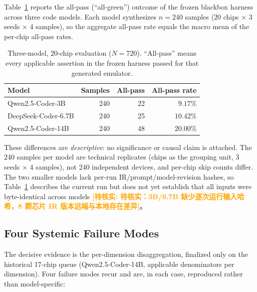 \documentclass[preprint,review]{elsarticle}
\theoremstyle{definition}
\newcommand{\unverified}[1]{\textcolor{orange}{\textbf{[待核实: #1]}}}
\begin{document}
Table~\ref{tab:three-model} reports the all-pass (``all-green'') outcome of the frozen
blackbox harness across three code models. Each model synthesizes $n=240$ samples (20 chips
$\times$ 3 seeds $\times$ 4 samples), so the aggregate all-pass rate equals the macro mean of
the per-chip all-pass rates.

\begin{table}[t]
\centering
\caption{Three-model, 20-chip evaluation ($N=720$). ``All-pass'' means every applicable
assertion in the frozen harness passed for that generated emulator.}
\label{tab:three-model}
\small
\begin{tabular}{@{}l r r r@{}}
\toprule
Model & Samples & All-pass & All-pass rate \\
\midrule
Qwen2.5-Coder-3B & 240 & 22 & $9.17\%$ \\
DeepSeek-Coder-6.7B & 240 & 25 & $10.42\%$ \\
Qwen2.5-Coder-14B & 240 & 48 & $20.00\%$ \\
\bottomrule
\end{tabular}
\end{table}

These differences are \emph{descriptive}: no significance or causal claim is attached. The
240 samples per model are technical replicates (chips as the grouping unit, 3 seeds
$\times$ 4 samples), not 240 independent devices, and per-chip skip counts differ. The
two smaller models lack per-run IR/prompt/model-revision hashes, so
Table~\ref{tab:three-model} describes the current run but does not yet establish that all
inputs were byte-identical across models \unverified{待核实：3B/6.7B 缺少逐次运行输入哈希，8 颗芯片 IR 版本远端与本地存在差异}。

\subsection{Four Systemic Failure Modes}
\label{sec:four-defects}

The decisive evidence is the per-dimension disaggregation, finalized only on the historical
17-chip queue (Qwen2.5-Coder-14B, applicable denominators per dimension). Four failure modes
recur and are, in each case, reproduced rather than model-specific:
\end{document}
